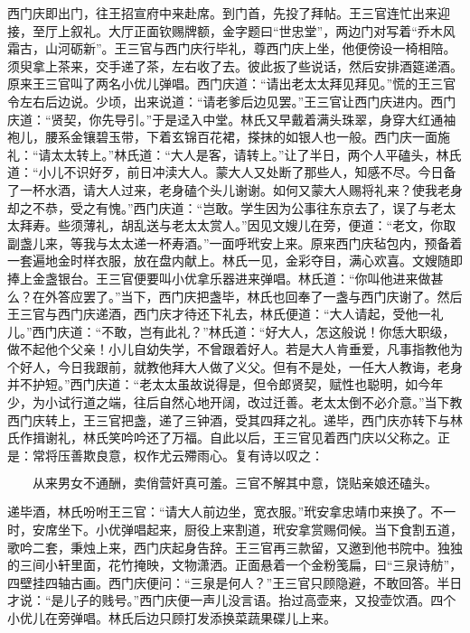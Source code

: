 西门庆即出门，往王招宣府中来赴席。到门首，先投了拜帖。王三官连忙出来迎接，至厅上叙礼。大厅正面钦赐牌额，金字题曰“世忠堂”，两边门对写着“乔木风霜古，山河砺新”。王三官与西门庆行毕礼，尊西门庆上坐，他便傍设一椅相陪。须臾拿上茶来，交手递了茶，左右收了去。彼此扳了些说话，然后安排酒筵递酒。原来王三官叫了两名小优儿弹唱。西门庆道：“请出老太太拜见拜见。”慌的王三官令左右后边说。少顷，出来说道：“请老爹后边见罢。”王三官让西门庆进内。西门庆道：“贤契，你先导引。”于是迳入中堂。林氏又早戴着满头珠翠，身穿大红通袖袍儿，腰系金镶碧玉带，下着玄锦百花裙，搽抹的如银人也一般。西门庆一面施礼：“请太太转上。”林氏道：“大人是客，请转上。”让了半日，两个人平磕头，林氏道：“小儿不识好歹，前日冲渎大人。蒙大人又处断了那些人，知感不尽。今日备了一杯水酒，请大人过来，老身磕个头儿谢谢。如何又蒙大人赐将礼来？使我老身却之不恭，受之有愧。”西门庆道：“岂敢。学生因为公事往东京去了，误了与老太太拜寿。些须薄礼，胡乱送与老太太赏人。”因见文嫂儿在旁，便道：“老文，你取副盏儿来，等我与太太递一杯寿酒。”一面呼玳安上来。原来西门庆毡包内，预备着一套遍地金时样衣服，放在盘内献上。林氏一见，金彩夺目，满心欢喜。文嫂随即捧上金盏银台。王三官便要叫小优拿乐器进来弹唱。林氏道：“你叫他进来做甚么？在外答应罢了。”当下，西门庆把盏毕，林氏也回奉了一盏与西门庆谢了。然后王三官与西门庆递酒，西门庆才待还下礼去，林氏便道：“大人请起，受他一礼儿。”西门庆道：“不敢，岂有此礼？”林氏道：“好大人，怎这般说！你恁大职级，做不起他个父亲！小儿自幼失学，不曾跟着好人。若是大人肯垂爱，凡事指教他为个好人，今日我跟前，就教他拜大人做了义父。但有不是处，一任大人教诲，老身并不护短。”西门庆道：“老太太虽故说得是，但令郎贤契，赋性也聪明，如今年少，为小试行道之端，往后自然心地开阔，改过迁善。老太太倒不必介意。”当下教西门庆转上，王三官把盏，递了三钟酒，受其四拜之礼。递毕，西门庆亦转下与林氏作揖谢礼，林氏笑吟吟还了万福。自此以后，王三官见着西门庆以父称之。正是：常将压善欺良意，权作尤云殢雨心。复有诗以叹之：

\[
从来男女不通酬，卖俏营奸真可羞。
三官不解其中意，饶贴亲娘还磕头。
\]

递毕酒，林氏吩咐王三官：“请大人前边坐，宽衣服。”玳安拿忠靖巾来换了。不一时，安席坐下。小优弹唱起来，厨役上来割道，玳安拿赏赐伺候。当下食割五道，歌吟二套，秉烛上来，西门庆起身告辞。王三官再三款留，又邀到他书院中。独独的三间小轩里面，花竹掩映，文物潇洒。正面悬着一个金粉笺扁，曰“三泉诗舫”，四壁挂四轴古画。西门庆便问：“三泉是何人？”王三官只顾隐避，不敢回答。半日才说：“是儿子的贱号。”西门庆便一声儿没言语。抬过高壶来，又投壶饮酒。四个小优儿在旁弹唱。林氏后边只顾打发添换菜蔬果碟儿上来。

